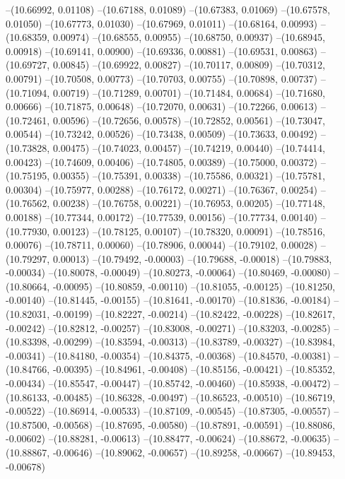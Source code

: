 --(10.66992, 0.01108)
--(10.67188, 0.01089)
--(10.67383, 0.01069)
--(10.67578, 0.01050)
--(10.67773, 0.01030)
--(10.67969, 0.01011)
--(10.68164, 0.00993)
--(10.68359, 0.00974)
--(10.68555, 0.00955)
--(10.68750, 0.00937)
--(10.68945, 0.00918)
--(10.69141, 0.00900)
--(10.69336, 0.00881)
--(10.69531, 0.00863)
--(10.69727, 0.00845)
--(10.69922, 0.00827)
--(10.70117, 0.00809)
--(10.70312, 0.00791)
--(10.70508, 0.00773)
--(10.70703, 0.00755)
--(10.70898, 0.00737)
--(10.71094, 0.00719)
--(10.71289, 0.00701)
--(10.71484, 0.00684)
--(10.71680, 0.00666)
--(10.71875, 0.00648)
--(10.72070, 0.00631)
--(10.72266, 0.00613)
--(10.72461, 0.00596)
--(10.72656, 0.00578)
--(10.72852, 0.00561)
--(10.73047, 0.00544)
--(10.73242, 0.00526)
--(10.73438, 0.00509)
--(10.73633, 0.00492)
--(10.73828, 0.00475)
--(10.74023, 0.00457)
--(10.74219, 0.00440)
--(10.74414, 0.00423)
--(10.74609, 0.00406)
--(10.74805, 0.00389)
--(10.75000, 0.00372)
--(10.75195, 0.00355)
--(10.75391, 0.00338)
--(10.75586, 0.00321)
--(10.75781, 0.00304)
--(10.75977, 0.00288)
--(10.76172, 0.00271)
--(10.76367, 0.00254)
--(10.76562, 0.00238)
--(10.76758, 0.00221)
--(10.76953, 0.00205)
--(10.77148, 0.00188)
--(10.77344, 0.00172)
--(10.77539, 0.00156)
--(10.77734, 0.00140)
--(10.77930, 0.00123)
--(10.78125, 0.00107)
--(10.78320, 0.00091)
--(10.78516, 0.00076)
--(10.78711, 0.00060)
--(10.78906, 0.00044)
--(10.79102, 0.00028)
--(10.79297, 0.00013)
--(10.79492, -0.00003)
--(10.79688, -0.00018)
--(10.79883, -0.00034)
--(10.80078, -0.00049)
--(10.80273, -0.00064)
--(10.80469, -0.00080)
--(10.80664, -0.00095)
--(10.80859, -0.00110)
--(10.81055, -0.00125)
--(10.81250, -0.00140)
--(10.81445, -0.00155)
--(10.81641, -0.00170)
--(10.81836, -0.00184)
--(10.82031, -0.00199)
--(10.82227, -0.00214)
--(10.82422, -0.00228)
--(10.82617, -0.00242)
--(10.82812, -0.00257)
--(10.83008, -0.00271)
--(10.83203, -0.00285)
--(10.83398, -0.00299)
--(10.83594, -0.00313)
--(10.83789, -0.00327)
--(10.83984, -0.00341)
--(10.84180, -0.00354)
--(10.84375, -0.00368)
--(10.84570, -0.00381)
--(10.84766, -0.00395)
--(10.84961, -0.00408)
--(10.85156, -0.00421)
--(10.85352, -0.00434)
--(10.85547, -0.00447)
--(10.85742, -0.00460)
--(10.85938, -0.00472)
--(10.86133, -0.00485)
--(10.86328, -0.00497)
--(10.86523, -0.00510)
--(10.86719, -0.00522)
--(10.86914, -0.00533)
--(10.87109, -0.00545)
--(10.87305, -0.00557)
--(10.87500, -0.00568)
--(10.87695, -0.00580)
--(10.87891, -0.00591)
--(10.88086, -0.00602)
--(10.88281, -0.00613)
--(10.88477, -0.00624)
--(10.88672, -0.00635)
--(10.88867, -0.00646)
--(10.89062, -0.00657)
--(10.89258, -0.00667)
--(10.89453, -0.00678)
